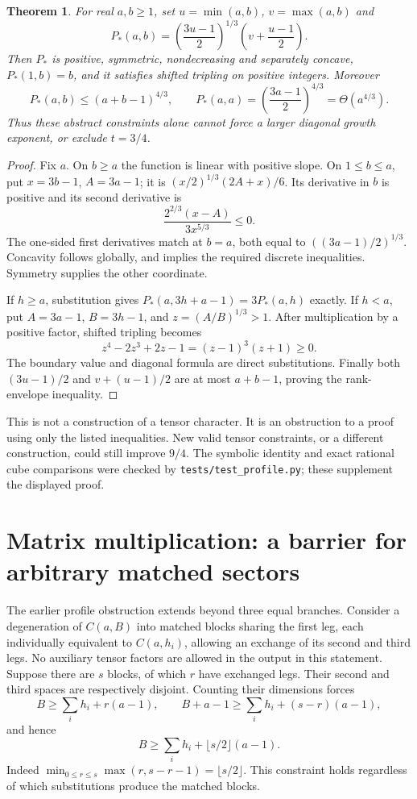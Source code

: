 \documentclass[11pt]{article}
\newtheorem{theorem}{Theorem}
\begin{document}
\begin{theorem}\label{thm:barrier}
For real $a,b\ge1$, set $u=\min(a,b)$, $v=\max(a,b)$ and
\[
 P_*(a,b)=\left(\frac{3u-1}{2}\right)^{1/3}
                      \left(v+\frac{u-1}{2}\right).
\]
Then $P_*$ is positive, symmetric, nondecreasing and separately concave,
$P_*(1,b)=b$, and it satisfies shifted tripling on positive integers.
Moreover
\[
 P_*(a,b)\le(a+b-1)^{4/3},\qquad
 P_*(a,a)=\left(\frac{3a-1}{2}\right)^{4/3}=\Theta(a^{4/3}).
\]
Thus these abstract constraints alone cannot force a larger diagonal
growth exponent, or exclude $t=3/4$.
\end{theorem}
\begin{proof}
Fix $a$. On $b\ge a$ the function is linear with positive slope.
On $1\le b\le a$, put $x=3b-1$, $A=3a-1$; it is
$(x/2)^{1/3}(2A+x)/6$. Its derivative in $b$ is positive and its
second derivative is
\[
 \frac{2^{2/3}(x-A)}{3x^{5/3}}\le0.
\]
The one-sided first derivatives match at $b=a$, both equal to
$((3a-1)/2)^{1/3}$. Concavity follows globally, and implies the required
discrete inequalities. Symmetry supplies the other coordinate.

If $h\ge a$, substitution gives
$P_*(a,3h+a-1)=3P_*(a,h)$ exactly. If $h<a$, put
$A=3a-1$, $B=3h-1$, and $z=(A/B)^{1/3}>1$.
After multiplication by a positive factor, shifted tripling becomes
\[
 z^4-2z^3+2z-1=(z-1)^3(z+1)\ge0.
\]
The boundary value and diagonal formula are direct substitutions.
Finally both $(3u-1)/2$ and $v+(u-1)/2$ are at most $a+b-1$,
proving the rank-envelope inequality.
\end{proof}
This is not a construction of a tensor character. It is an obstruction
to a proof using only the listed inequalities. New valid tensor
constraints, or a different construction, could still improve $9/4$.
The symbolic identity and exact rational cube comparisons were checked
by \texttt{tests/test\_profile.py}; these supplement the displayed proof.

\section{Matrix multiplication: a barrier for arbitrary matched sectors}
\label{sec:sector-barrier}
The earlier profile obstruction extends beyond three equal branches.
Consider a degeneration of $C(a,B)$ into matched blocks sharing the
first leg, each individually equivalent to $C(a,h_i)$, allowing an
exchange of its second and third legs. No auxiliary tensor factors
are allowed in the output in this statement. Suppose there are $s$
blocks, of which $r$ have exchanged legs. Their second and third spaces
are respectively disjoint. Counting their dimensions forces
\[
 B\ge\sum_i h_i+r(a-1),\qquad
 B+a-1\ge\sum_i h_i+(s-r)(a-1),
\]
and hence
\begin{equation}\label{eq:packing-bound}
 B\ge\sum_i h_i+\lfloor s/2\rfloor(a-1).
\end{equation}
Indeed $\min_{0\le r\le s}\max(r,s-r-1)=\lfloor s/2\rfloor$.
This constraint holds regardless of which substitutions produce the
matched blocks.
\end{document}
